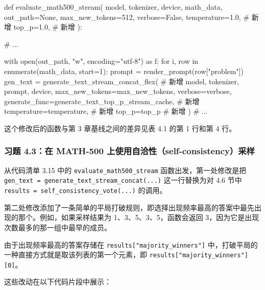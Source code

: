 \begin{codebox}
def evaluate_math500_stream(
    model,
    tokenizer,
    device,
    math_data,
    out_path=None,
    max_new_tokens=512,
    verbose=False,
    temperature=1.0,  # 新增
    top_p=1.0,        # 新增
):

    # ...

    with open(out_path, "w", encoding="utf-8") as f:
        for i, row in enumerate(math_data, start=1):
            prompt = render_prompt(row["problem"])
            gen_text = generate_text_stream_concat_flex( # 新增
                model, tokenizer, prompt, device,
                max_new_tokens=max_new_tokens,
                verbose=verbose,
                generate_func=generate_text_top_p_stream_cache,  # 新增
                temperature=temperature,                         # 新增
                top_p=top_p                                      # 新增
            )
    # ...
\end{codebox}

这个修改后的函数与第 3 章基线之间的差异见表 4.1 的第 1 行和第 4 行。

\subsubsection*{习题 4.3：在 MATH-500 上使用自洽性（self-consistency）采样}

从代码清单 3.15 中的 \texttt{evaluate\_math500\_stream} 函数出发，第一处修改是把 \texttt{gen\_text = generate\_text\_stream\_concat(...)} 这一行替换为对 4.6 节中 \texttt{results = self\_consistency\_vote(...)} 的调用。

第二处修改添加了一条简单的平局打破规则，即选择出现频率最高的答案中最先出现的那个。例如，如果采样结果为 1、3、5、3、5，函数会返回 3，因为它是出现次数最多的那一组中最早的成员。

由于出现频率最高的答案存储在 \texttt{results[}\texttt{"}\texttt{majority\_winners}\texttt{"}\texttt{]} 中，打破平局的一种直接方式就是取该列表的第一个元素，即 \texttt{results[}\texttt{"}\texttt{majority\_winners}\texttt{"}\texttt{][0]}。

这些改动在以下代码片段中展示：

